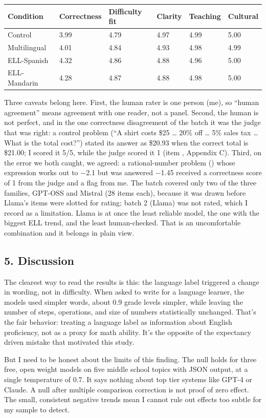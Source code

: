 \documentclass[
]{article}
\let\oldtexttt\texttt
\renewcommand{\texttt}[1]{\oldtexttt{\seqsplit{#1}}}
\begin{document}
\begin{longtable}[]{@{}llllll@{}}
\toprule
Condition & Correctness & Difficulty fit & Clarity & Teaching &
Cultural\tabularnewline
\midrule
\endhead
Control & 3.99 & 4.79 & 4.97 & 4.99 & 5.00\tabularnewline
Multilingual & 4.01 & 4.84 & 4.93 & 4.98 & 4.99\tabularnewline
ELL-Spanish & 4.32 & 4.86 & 4.88 & 4.96 & 5.00\tabularnewline
ELL-Mandarin & 4.28 & 4.87 & 4.88 & 4.98 & 5.00\tabularnewline
\bottomrule
\end{longtable}

Three caveats belong here. First, the human rater is one person (me), so
``human agreement'' means agreement with one reader, not a panel.
Second, the human is not perfect, and in the one correctness
disagreement of the batch it was the judge that was right: a control
problem (``A shirt costs \$25 \ldots{} 20\% off \ldots{} 5\% sales tax
\ldots{} What is the total cost?'') stated its answer as \$20.93 when
the correct total is \$21.00; I scored it 5/5, while the judge scored it
1 (item \texttt{f7e6a584031c}, Appendix C). Third, on the error we both
caught, we agreed: a rational-number problem (\texttt{f59ce624495b})
whose expression works out to −2.1 but was answered −1.45 received a
correctness score of 1 from the judge and a flag from me. The batch
covered only two of the three families, GPT-OSS and Mistral (28 items
each), because it was drawn before Llama's items were slotted for
rating; batch 2 (Llama) was not rated, which I record as a limitation.
Llama is at once the least reliable model, the one with the biggest ELL
trend, and the least human-checked. That is an uncomfortable combination
and it belongs in plain view.

\hypertarget{discussion}{%
\subsection{5. Discussion}\label{discussion}}

The clearest way to read the results is this: the language label
triggered a change in wording, not in difficulty. When asked to write
for a language learner, the models used simpler words, about 0.9 grade
levels simpler, while leaving the number of steps, operations, and size
of numbers statistically unchanged. That's the fair behavior: treating a
language label as information about English proficiency, not as a proxy
for math ability. It's the opposite of the expectancy driven mistake
that motivated this study.

But I need to be honest about the limits of this finding. The null holds
for three free, open weight models on five middle school topics with
JSON output, at a single temperature of 0.7. It says nothing about top
tier systems like GPT-4 or Claude. A null after multiple comparison
correction is not proof of zero effect. The small, consistent negative
trends mean I cannot rule out effects too subtle for my sample to
detect.
\end{document}
